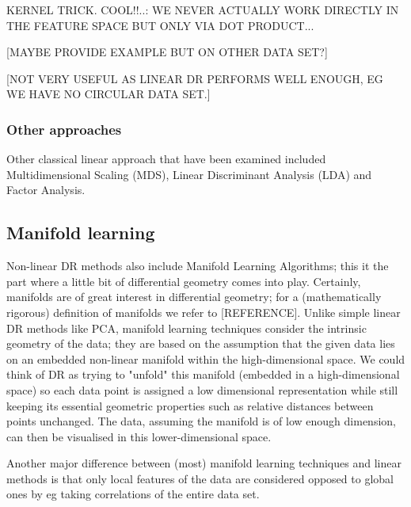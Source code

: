 \documentclass[journal, a4paper]{IEEEtran}
\begin{document}
KERNEL TRICK. COOL!!..: WE NEVER ACTUALLY WORK DIRECTLY IN THE FEATURE SPACE BUT ONLY VIA DOT PRODUCT...


[MAYBE PROVIDE EXAMPLE BUT ON OTHER DATA SET?]

[NOT VERY USEFUL AS LINEAR DR PERFORMS WELL ENOUGH, EG WE HAVE NO CIRCULAR DATA SET.] 


\hfill
\subsubsection{Other approaches}

Other classical linear approach that have been examined included Multidimensional Scaling (MDS), Linear Discriminant Analysis (LDA) and Factor Analysis. 


\subsection{Manifold learning}

Non-linear DR methods also include Manifold Learning Algorithms; this it the part where a little bit of differential geometry comes into play. Certainly, manifolds are of great interest in differential geometry; for a (mathematically rigorous) definition of manifolds we refer to [REFERENCE].
Unlike simple linear DR methods like PCA, manifold learning techniques consider the intrinsic geometry of the data; they are based on the assumption that the given data lies on an embedded non-linear manifold within the high-dimensional space. We could think of DR as trying to "unfold" this manifold (embedded in a high-dimensional space) so each data point is assigned a low dimensional representation while still keeping its essential geometric properties such as relative distances between points unchanged.
The data, assuming the manifold is of low enough dimension, can then be visualised in this lower-dimensional space.

Another major difference between (most) manifold learning techniques and linear methods is that only local features of the data are considered opposed to global ones by eg taking correlations of the entire data set.
\end{document}
